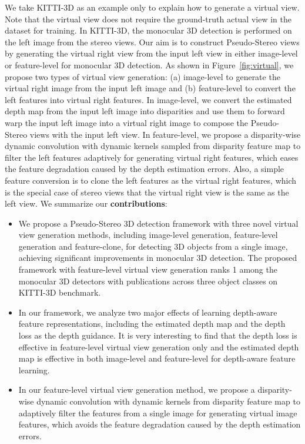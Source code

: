 \documentclass[10pt,twocolumn,letterpaper]{article}
\begin{document}
 

We take KITTI-3D as an example only to explain how to generate a virtual view. Note that the virtual view does not require the ground-truth actual view in the dataset for training. In KITTI-3D, the monocular 3D detection is performed on the left image from the stereo views. Our aim is to construct Pseudo-Stereo views by generating the virtual right view from the input left view in either image-level or feature-level for monocular 3D detection. As shown in Figure~\ref{fig:virtual}, we propose two types of virtual view generation: (a) image-level to generate the virtual right image from the input left image and (b) feature-level to convert the left features into virtual right features. In image-level, we convert the estimated depth map from the input left image into disparities and use them to forward warp the input left image into a virtual right image to compose the Pseudo-Stereo views with the input left view. In feature-level, we propose a disparity-wise dynamic convolution with dynamic kernels sampled from disparity feature map to filter the left features adaptively for generating virtual right features, which eases the feature degradation caused by the depth estimation errors.
Also, a simple feature conversion is to clone the left features as the virtual right features, which is the special case of stereo views that the virtual right view is the same as the left view. We summarize our \textbf{contributions}:
\begin{itemize}
\vspace{-3mm}
    \item We propose a Pseudo-Stereo 3D detection framework with three novel virtual view generation methods, including image-level generation, feature-level generation and feature-clone, for detecting 3D objects from a single image, achieving significant improvements in monocular 3D detection. The proposed framework with feature-level virtual view generation ranks 1 among the monocular 3D detectors with publications across three object classes on KITTI-3D benchmark.
    \vspace{-3mm}
    \item In our framework, we analyze two major effects of learning depth-aware feature representations, including the estimated depth map and the depth loss as the depth guidance. It is very interesting to find that the depth loss is effective in feature-level virtual view generation only and the estimated depth map is effective in both image-level and feature-level for depth-aware feature learning.    
    \vspace{-3mm}
    \item In our feature-level virtual view generation method, we propose a disparity-wise dynamic convolution with dynamic kernels from disparity feature map to adaptively filter the features from a single image for generating virtual image features, which avoids the feature degradation caused by the depth estimation errors.
\end{itemize}
 
\end{document}
